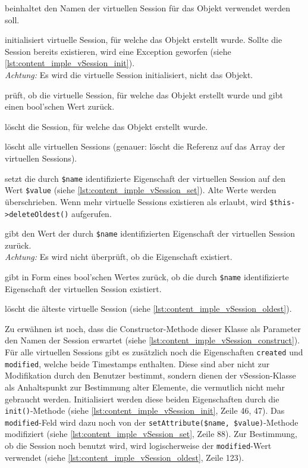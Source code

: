 \begin{description}[style=nextline]
	\item[\texttt{private \$name}] beinhaltet den Namen der virtuellen Session für das Objekt verwendet werden soll.
	\item[\texttt{public function init()}] initialisiert virtuelle Session, für welche das Objekt erstellt wurde. Sollte die Session bereits existieren, wird eine Exception geworfen (siehe \autoref{lst:content_imple_vSession_init}).\\
		\textit{Achtung:} Es wird die virtuelle Session initialisiert, nicht das Objekt.
	\item[\texttt{public function exists()}] prüft, ob die virtuelle Session, für welche das Objekt erstellt wurde und gibt einen bool'schen Wert zurück.
	\item[\texttt{public function destroy()}] löscht die Session, für welche das Objekt erstellt wurde.
	\item[\texttt{public function destroyAll()}] löscht alle virtuellen Sessions (genauer: löscht die Referenz auf das Array der virtuellen Sessions).
	\item[\texttt{public function setAttribute(\$name, \$value)}] setzt die durch \texttt{\$name} identifizierte Eigenschaft der virtuellen Session auf den Wert \texttt{\$value} (siehe \autoref{lst:content_imple_vSession_set}). Alte Werte werden überschrieben. Wenn mehr virtuelle Sessions existieren als erlaubt, wird \texttt{\$this->deleteOldest()} aufgerufen.
	\item[\texttt{public function getAttribute(\$name)}] gibt den Wert der durch \texttt{\$name} identifizierten Eigenschaft der virtuellen Session zurück.\\
		\textit{Achtung:} Es wird nicht überprüft, ob die Eigenschaft existiert.
	\item[\texttt{public function attributeIsset(\$name)}] gibt in Form eines bool'schen Wertes zurück, ob die durch \texttt{\$name} identifizierte Eigenschaft der virtuellen Session existiert.
	\item[\texttt{public function deleteOldest()}] löscht die älteste virtuelle Session (siehe \autoref{lst:content_imple_vSession_oldest}).
\end{description}
Zu erwähnen ist noch, dass die Constructor-Methode dieser Klasse als Parameter den Namen der Session erwartet (siehe \autoref{lst:content_imple_vSession_construct}).\\
Für alle virtuellen Sessions gibt es zusätzlich noch die Eigenschaften \texttt{created} und \texttt{modified}, welche beide Timestamps enthalten. Diese sind aber nicht zur Modifikation durch den Benutzer bestimmt, sondern dienen der vSession-Klasse als Anhaltspunkt zur Bestimmung alter Elemente, die vermutlich nicht mehr gebraucht werden. Initialisiert werden diese beiden Eigenschaften durch die \texttt{init()}-Methode (siehe \autoref{lst:content_imple_vSession_init}, Zeile 46, 47). Das \texttt{modified}-Feld wird dazu noch von der \texttt{setAttribute(\$name, \$value)}-Methode modifiziert (siehe \autoref{lst:content_imple_vSession_set}, Zeile 88). Zur Bestimmung, ob die Session noch benutzt wird, wird logischerweise der \texttt{modified}-Wert verwendet (siehe \autoref{lst:content_imple_vSession_oldest}, Zeile 123).\\
